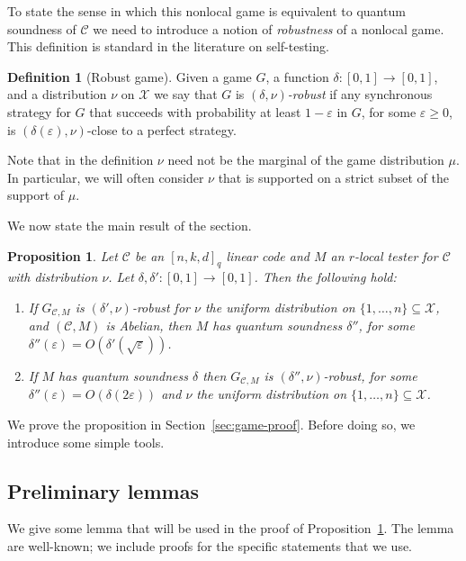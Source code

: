 \documentclass[11pt]{article}
\newtheorem{proposition}[theorem]{Proposition}
\theoremstyle{definition}
\newtheorem{definition}[theorem]{Definition}
\newcommand{\code}{\mathcal{C}}
\newcommand{\mC}{\ensuremath{\mathcal{C}}}
\newcommand{\mX}{\ensuremath{\mathcal{X}}}
\newcommand{\eps}{\varepsilon}
\begin{document}
To state the sense in which this nonlocal game is equivalent to quantum soundness of $\code$ we need to introduce a notion of \emph{robustness} of a nonlocal game. This definition is standard in the literature on self-testing.


\begin{definition}[Robust game]
Given a game $G$, a function $\delta:[0,1]\to[0,1]$, and a distribution $\nu$ on $\mX$ we say that $G$ is \emph{$(\delta,\nu)$-robust} if any synchronous strategy for $G$ that succeeds with probability at least $1-\eps$ in $G$, for some $\eps\geq 0$, is
 $(\delta(\eps),\nu)$-close to a perfect strategy.
\end{definition}

Note that in the definition $\nu$ need not be the marginal of the game distribution $\mu$. In particular, we will often consider $\nu$ that is supported on a strict subset of the support of $\mu$. 

We now state the main result of the section. 

\begin{proposition}\label{prop:sound-game}
Let $\code$ be an $[n,k,d]_q$ linear code and $M$ an $r$-local tester for $\code$ with distribution $\nu$. Let $\delta,\delta':[0,1]\to[0,1]$. Then the following hold:
\begin{enumerate}
\item If $G_{\code,M}$ is $(\delta',\nu)$-robust for $\nu$ the uniform distribution on $\{1,\ldots,n\}\subseteq \mX$, and $(\mC,M)$ is Abelian, then $M$ has quantum soundness $\delta''$, for some $\delta''(\eps) = O(\delta'(\sqrt{\eps}))$. 
\item If $M$ has quantum soundness $\delta$ then $G_{\code,M}$ is $(\delta'',\nu)$-robust, for some $\delta''(\eps)=O({\delta(2\eps)})$ and $\nu$ the uniform distribution on $\{1,\ldots,n\}\subseteq \mX$. 
\end{enumerate}
\end{proposition}

We prove the proposition in Section~\ref{sec:game-proof}. Before doing so, we introduce some simple tools. 

\subsection{Preliminary lemmas}

We give some lemma that will be used in the proof of Proposition~\ref{prop:sound-game}. The lemma are well-known; we include proofs for the specific statements that we use. 
\end{document}
